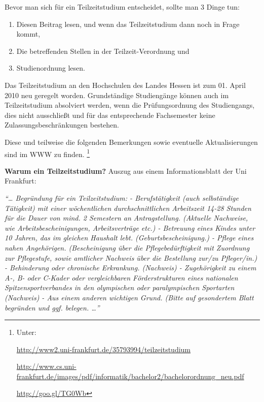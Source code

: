 \label{teilzeitstudium}

Bevor man sich für ein Teilzeitstudium entscheidet, sollte man 3 Dinge tun:
\begin{enumerate}
\setlength{\parskip}{3pt}
	\item Diesen Beitrag lesen, und wenn das Teilzeitstudium dann noch in Frage kommt,
	\item Die betreffenden Stellen in der Teilzeit-Verordnung und 
	\item Studienordnung lesen.
\end{enumerate}

Das Teilzeitstudium an den Hochschulen des Landes Hessen ist zum 01. April 2010 neu geregelt worden. Grundständige Studiengänge können auch im Teilzeitstudium absolviert werden, wenn die Prüfungsordnung des Studiengangs, dies nicht ausschließt und für das entsprechende Fachsemester keine Zulassungsbeschränkungen bestehen.

Diese und teilweise die folgenden Bemerkungen sowie eventuelle Aktualisierungen sind im WWW zu finden.
\footnote{
 Unter:

\url{http://www2.uni-frankfurt.de/35793994/teilzeitstudium}

\url{http://www.cs.uni-frankfurt.de/images/pdf/informatik/bachelor2/bachelorordnung\_neu.pdf}

\url{http://goo.gl/TG0Wb}
}


\textbf{Warum ein Teilzeitstudium?} \newline
Auszug aus einem Informationsblatt der Uni Frankfurt:

\emph{``\ldots
Begründung für ein Teilzeitstudium: \linebreak
- Berufstätigkeit (auch selbständige Tätigkeit) mit einer wöchentlichen durchschnittlichen Arbeitszeit 14-28 Stunden für die Dauer von mind. 2 Semestern an Antragstellung. (Aktuelle Nachweise, wie Arbeitsbescheinigungen, Arbeitsverträge etc.)\linebreak
- Betreuung eines Kindes unter 10 Jahren, das im gleichen Haushalt lebt. (Geburtsbescheinigung.) \linebreak
- Pflege eines nahen Angehörigen. (Bescheinigung über die Pflegebedürftigkeit mit Zuordnung zur Pflegestufe, sowie amtlicher Nachweis über die Bestellung zur/zu Pfleger/in.) \linebreak
- Behinderung oder chronische Erkrankung. (Nachweis)\linebreak
- Zugehörigkeit zu einem A-, B- oder C-Kader oder vergleichbaren Förderstrukturen eines nationalen Spitzensportverbandes in den olympischen oder paralympischen Sportarten (Nachweis)\linebreak
- Aus einem anderen wichtigen Grund. (Bitte auf gesondertem Blatt begründen und ggf. belegen. \ldots{}''}


